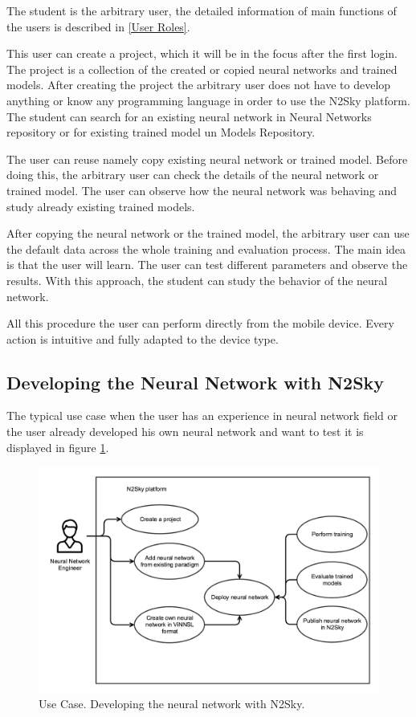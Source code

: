 The student is the arbitrary user, the detailed information of main functions of the users is described in \autoref{User Roles}. 

This user can create a project, which it will be in the focus after the first login. The project is a collection of the created or copied neural networks and trained models. After creating the project the arbitrary user does not have to develop anything or know any programming language in order to use the N2Sky platform. The student can search for an existing neural network in Neural Networks repository or for existing trained model un Models Repository. 

The user can reuse namely copy existing neural network or trained model. Before doing this, the arbitrary user can check the details of the neural network or trained model.  
The user can observe how the neural network was behaving and study already existing trained models. 

After copying the neural network or the trained model, the arbitrary user can use the default data across the whole training and evaluation process. The main idea is that the user will learn. The user can test different parameters and observe the results. With this approach, the student can study the behavior of the neural network.

All this procedure the user can perform directly from the mobile device.  Every action is intuitive and fully adapted to the device type.

\subsection{Developing the Neural Network with N2Sky}\label{Developing the neural network with N2Sky}

The typical use case when the user has an experience in neural network field or the user already developed his own neural network and want to test it is displayed in figure \ref{fig:user_case_engin}.

\begin{figure}[htbp]
\begin{center}
  \includegraphics[width=\linewidth]{components/usecase/img/user_case_engin.png}
  \caption{Use Case. Developing the neural network with N2Sky.}
  \label{fig:user_case_engin}
\end{center}
\end{figure} 

